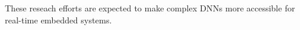 These reseach efforts are expected to make complex DNNs more
accessible for real-time embedded systems.

  
